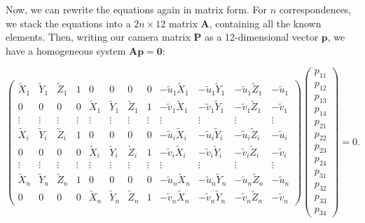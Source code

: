 \documentclass[12pt]{article}
\begin{document}
Now, we can rewrite the equations again in matrix form. For $n$ correspondences, we stack the equations into a $2n \times 12$ matrix $\mathbf{A}$, containing all the known elements. Then, writing our camera matrix $\mathbf{P}$ as a 12-dimensional vector $\mathbf{p}$, we have a homogeneous system $\mathbf{A}\mathbf{p}=\mathbf{0}$:

$$
\begin{pmatrix}
\tilde{X}_1 & \tilde{Y}_1 & \tilde{Z}_1 & 1 & 0 & 0 & 0 & 0 & -\tilde{u}_1 \tilde{X}_1 & -\tilde{u}_1 \tilde{Y}_1 & -\tilde{u}_1 \tilde{Z}_1 & -\tilde{u}_1 \\
0 & 0 & 0 & 0 & \tilde{X}_1 & \tilde{Y}_1 & \tilde{Z}_1 & 1 & -\tilde{v}_1 \tilde{X}_1 & -\tilde{v}_1 \tilde{Y}_1 & -\tilde{v}_1 \tilde{Z}_1 & -\tilde{v}_1 \\
\vdots & \vdots & \vdots & \vdots & \vdots & \vdots & \vdots & \vdots & \vdots & \vdots & \vdots & \vdots \\
\tilde{X}_i & \tilde{Y}_i & \tilde{Z}_i & 1 & 0 & 0 & 0 & 0 & -\tilde{u}_i \tilde{X}_i & -\tilde{u}_i \tilde{Y}_i & -\tilde{u}_i \tilde{Z}_i & -\tilde{u}_i \\
0 & 0 & 0 & 0 & \tilde{X}_i & \tilde{Y}_i & \tilde{Z}_i & 1 & -\tilde{v}_i \tilde{X}_i & -\tilde{v}_i \tilde{Y}_i & -\tilde{v}_i \tilde{Z}_i & -\tilde{v}_i \\
\vdots & \vdots & \vdots & \vdots & \vdots & \vdots & \vdots & \vdots & \vdots & \vdots & \vdots & \vdots \\
\tilde{X}_n & \tilde{Y}_n & \tilde{Z}_n & 1 & 0 & 0 & 0 & 0 & -\tilde{u}_n \tilde{X}_n & -\tilde{u}_n \tilde{Y}_n & -\tilde{u}_n \tilde{Z}_n & -\tilde{u}_n \\
0 & 0 & 0 & 0 & \tilde{X}_n & \tilde{Y}_n & \tilde{Z}_n & 1 & -\tilde{v}_n \tilde{X}_n & -\tilde{v}_n \tilde{Y}_n & -\tilde{v}_n \tilde{Z}_n & -\tilde{v}_n
\end{pmatrix}
\begin{pmatrix} 
p_{11} \\ p_{12} \\ p_{13} \\ p_{14} \\
p_{21} \\ p_{22} \\ p_{23} \\ p_{24} \\
p_{31} \\ p_{32} \\ p_{33} \\ p_{34} 
\end{pmatrix}
= 0.
$$
\end{document}
